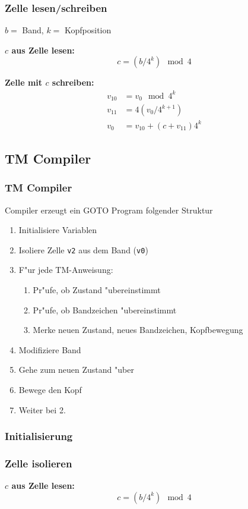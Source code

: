 \documentclass{beamer}
\begin{document}
\begin{frame}
\frametitle{Zelle lesen/schreiben}
$b =$ Band, $k=$ Kopfposition

\bigskip

{\bf $c$ aus Zelle lesen:}
\[
c=(b / 4^k) \mod 4
\]

\bigskip

{\bf Zelle mit $c$ schreiben:}
\begin{align*}
v_{10}&=v_0\mod 4^k\\
v_{11}&=4(v_0/4^{k+1})\\
v_0&=v_{10} + (c + v_{11})4^k
\end{align*}
\end{frame}

\begin{frame}
\section{TM Compiler}
\frametitle{TM Compiler}
Compiler erzeugt ein GOTO Program folgender Struktur
\begin{enumerate}
\item Initialisiere Variablen
\item Isoliere Zelle {\tt v2} aus dem Band ({\tt v0})
\item F"ur jede TM-Anweisung:
\begin{enumerate}
\item Pr"ufe, ob Zustand "ubereinstimmt
\item Pr"ufe, ob Bandzeichen "ubereinstimmt
\item Merke neuen Zustand, neues Bandzeichen, Kopfbewegung
\end{enumerate}
\item Modifiziere Band
\item Gehe zum neuen Zustand "uber
\item Bewege den Kopf
\item Weiter bei 2.
\end{enumerate}
\end{frame}

\begin{frame}
\frametitle{Initialisierung}

\end{frame}

\begin{frame}
\frametitle{Zelle isolieren}
{\bf $c$ aus Zelle lesen:}
\[
c=(b / 4^k) \mod 4
\]

\end{frame}
\end{document}
